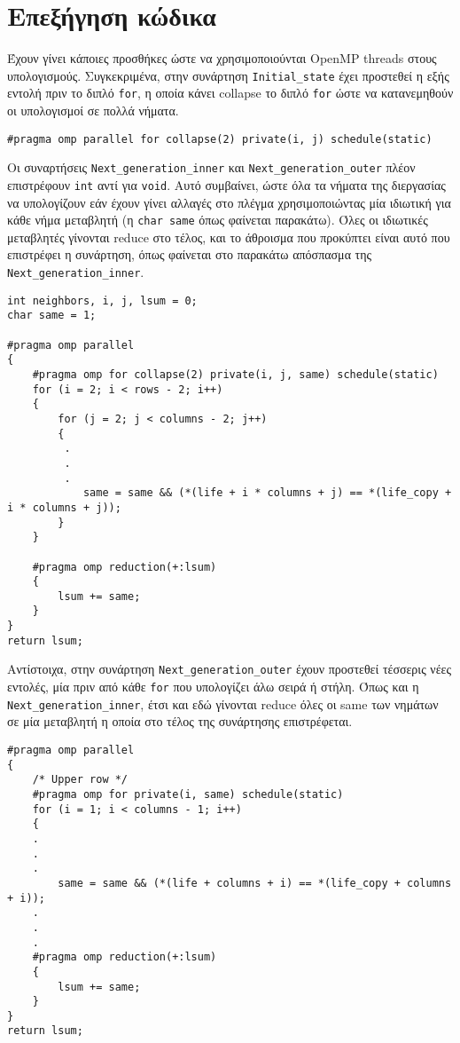 \section{Επεξήγηση κώδικα}
Έχουν γίνει κάποιες προσθήκες ώστε να χρησιμοποιούνται OpenMP threads στους υπολογισμούς. Συγκεκριμένα, στην συνάρτηση \texttt{Initial_state} έχει προστεθεί η εξής εντολή πριν το διπλό \texttt{for}, η οποία κάνει collapse το διπλό \texttt{for} ώστε να κατανεμηθούν οι υπολογισμοί σε πολλά νήματα. \\
\begin{tcolorbox}
\texttt{#pragma}\texttt{ omp parallel for collapse(2) private(i, j) schedule(static)}
\end{tcolorbox}
Οι συναρτήσεις \texttt{Next_generation_inner} και \texttt{Next_generation_outer} πλέον επιστρέφουν \texttt{int} αντί για \texttt{void}. Αυτό συμβαίνει, ώστε όλα τα νήματα της διεργασίας να υπολογίζουν εάν έχουν γίνει αλλαγές στο πλέγμα χρησιμοποιώντας μία ιδιωτική για κάθε νήμα μεταβλητή (η \texttt{char same} όπως φαίνεται παρακάτω). Όλες οι ιδιωτικές μεταβλητές γίνονται reduce στο τέλος, και το άθροισμα που προκύπτει είναι αυτό που επιστρέφει η συνάρτηση, όπως φαίνεται στο παρακάτω απόσπασμα της \texttt{Next_generation_inner}.
\clearpage
\begin{tcolorbox}
\begin{verbatim}
int neighbors, i, j, lsum = 0;
char same = 1;

#pragma omp parallel
{
    #pragma omp for collapse(2) private(i, j, same) schedule(static)
    for (i = 2; i < rows - 2; i++)
    {
        for (j = 2; j < columns - 2; j++)
        {
         .
         .
         .
            same = same && (*(life + i * columns + j) == *(life_copy + i * columns + j));
        }
    }

    #pragma omp reduction(+:lsum)
    {
        lsum += same;
    }
}
return lsum;       
\end{verbatim}
\end{tcolorbox}
Αντίστοιχα, στην συνάρτηση \texttt{Next_generation_outer} έχουν προστεθεί τέσσερις νέες εντολές, μία πριν από κάθε \texttt{for} που υπολογίζει άλω σειρά ή στήλη. Όπως και η \texttt{Next_generation_inner}, έτσι και εδώ γίνονται reduce όλες οι same των νημάτων σε μία μεταβλητή η οποία στο τέλος της συνάρτησης επιστρέφεται. \\
\begin{tcolorbox}
\begin{verbatim}
#pragma omp parallel
{
    /* Upper row */
    #pragma omp for private(i, same) schedule(static)
    for (i = 1; i < columns - 1; i++)
    {
    .
    .
    .
        same = same && (*(life + columns + i) == *(life_copy + columns + i));
    .
    .
    .
    #pragma omp reduction(+:lsum)
    {
        lsum += same;
    }
}
return lsum;
\end{verbatim}
\end{tcolorbox}

